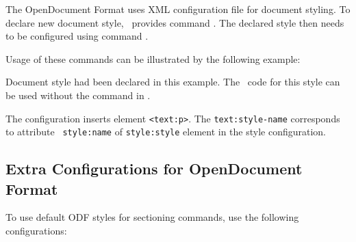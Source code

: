 The OpenDocument Format uses XML configuration file for document styling. To
declare new document style, \texfourht\ provides command
\texcommand{\NewConfigureOO}. The declared style then needs to be configured using command \texcommand{\ConfigureOO}.

Usage of these commands can be illustrated by the following example:

\begin{texsource}

\end{texsource}

Document style   had been declared in this example. The
\xml\ code  for this style can be used without the \texcommand{\HCode} command
in \texcommand{\ConfigureOO}.

The configuration  inserts element \verb|<text:p>|. The
\verb|text:style-name| corresponds to attribute \verb| style:name| of
\verb|style:style| element in the style configuration.


\subsection{Extra Configurations for OpenDocument Format}


To use default ODF styles for sectioning commands, use the following configurations:
\begin{texsource}
\end{texsource}

